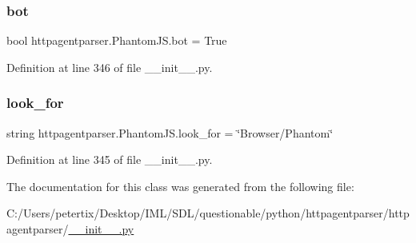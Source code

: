 \subsubsection{\texorpdfstring{bot}{bot}}
{\footnotesize\ttfamily bool httpagentparser.\+Phantom\+J\+S.\+bot = True\hspace{0.3cm}{\ttfamily [static]}}



Definition at line 346 of file \+\_\+\+\_\+init\+\_\+\+\_\+.\+py.

\hypertarget{classhttpagentparser_1_1_phantom_j_s_a936017178cad2cf0575e77f2599002cf}{}\label{classhttpagentparser_1_1_phantom_j_s_a936017178cad2cf0575e77f2599002cf} 
\subsubsection{\texorpdfstring{look\+\_\+for}{look\_for}}
{\footnotesize\ttfamily string httpagentparser.\+Phantom\+J\+S.\+look\+\_\+for = \char`\"{}Browser/Phantom\char`\"{}\hspace{0.3cm}{\ttfamily [static]}}



Definition at line 345 of file \+\_\+\+\_\+init\+\_\+\+\_\+.\+py.



The documentation for this class was generated from the following file\+:\begin{DoxyCompactItemize}
\item 
C\+:/\+Users/petertix/\+Desktop/\+I\+M\+L/\+S\+D\+L/questionable/python/httpagentparser/httpagentparser/\hyperlink{____init_____8py}{\+\_\+\+\_\+init\+\_\+\+\_\+.\+py}\end{DoxyCompactItemize}

